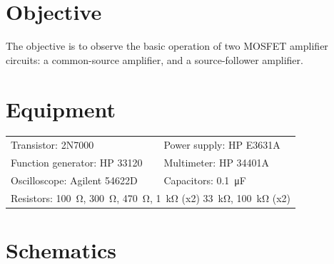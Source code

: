 

\section{Objective}
\label{sec:objective}

The objective is to observe the basic operation of two MOSFET amplifier circuits: a common-source amplifier, and a source-follower amplifier.

\section{Equipment}
\label{sec:equipment}

\begin{tabular}{ll}
  \centering
  Transistor: 2N7000               & Power supply: HP E3631A            \\
  Function generator: HP 33120 & Multimeter: HP 34401A              \\
  Oscilloscope: Agilent 54622D & Capacitors: \SI{0.1}{\micro\farad} \\
  \multicolumn{2}{l}{Resistors: \SI{100}{\ohm}, \SI{300}{\ohm}, \SI{470}{\ohm}, \SI{1}{\kilo\ohm} (x2) \SI{33}{\kilo\ohm}, \SI{100}{\kilo\ohm} (x2)} \\
\end{tabular}

\section{Schematics}
\label{sec:schematics}


